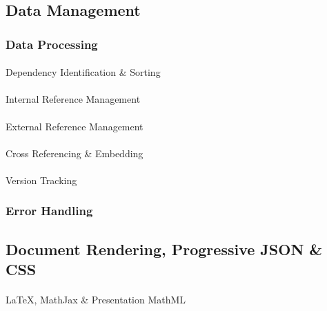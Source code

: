 \documentclass[
  british,
]{article}
\makeatletter
\let\oldparagraph\paragraph
\renewcommand{\paragraph}{
    \@ifstar
      \xxxParagraphStar
      \xxxParagraphNoStar
  }
\newcommand{\xxxParagraphStar}[1]{\oldparagraph*{#1}\mbox{}}
\newcommand{\xxxParagraphNoStar}[1]{\oldparagraph{#1}\mbox{}}
\makeatother
\begin{document}
\subsection{Data Management}\label{data-management}

\subsubsection{Data Processing}\label{data-processing-1}

\paragraph{Dependency Identification \&
Sorting}\label{dependency-identification-sorting}

\paragraph{Internal Reference
Management}\label{internal-reference-management}

\paragraph{External Reference
Management}\label{external-reference-management}

\paragraph{Cross Referencing \&
Embedding}\label{cross-referencing-embedding}

\paragraph{Version Tracking}\label{version-tracking}

\subsubsection{Error Handling}\label{error-handling}

\subsection{Document Rendering, Progressive JSON \&
CSS}\label{document-rendering-progressive-json-css}

\paragraph{LaTeX, MathJax \& Presentation
MathML}\label{latex-mathjax-presentation-mathml}
\end{document}
